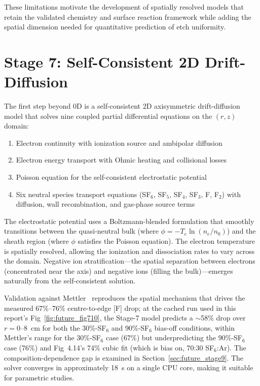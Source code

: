 \documentclass[11pt,a4paper]{report}
\newcommand{\Te}{T_e}
\begin{document}
These limitations motivate the development of spatially resolved models that retain the validated chemistry and surface reaction framework while adding the spatial dimension needed for quantitative prediction of etch uniformity.

\section{Stage 7: Self-Consistent 2D Drift-Diffusion}
\label{sec:future_stage7}

The first step beyond 0D is a self-consistent 2D axisymmetric drift-diffusion model that solves nine coupled partial differential equations on the $(r,z)$ domain:

\begin{enumerate}[nosep]
\item Electron continuity with ionization source and ambipolar diffusion
\item Electron energy transport with Ohmic heating and collisional losses
\item Poisson equation for the self-consistent electrostatic potential
\item Six neutral species transport equations (SF$_6$, SF$_5$, SF$_4$, SF$_3$, F, F$_2$) with diffusion, wall recombination, and gas-phase source terms
\end{enumerate}

The electrostatic potential uses a Boltzmann-blended formulation that smoothly transitions between the quasi-neutral bulk (where $\phi = -\Te \ln(n_e/n_0)$) and the sheath region (where $\phi$ satisfies the Poisson equation).  The electron temperature is spatially resolved, allowing the ionization and dissociation rates to vary across the domain.  Negative ion stratification---the spatial separation between electrons (concentrated near the axis) and negative ions (filling the bulk)---emerges naturally from the self-consistent solution.

Validation against Mettler~\cite{Mettler2025} reproduces the spatial mechanism that drives the measured 67\%--76\% centre-to-edge [F] drop; at the cached run used in this report's Fig~\ref{fig:future_fig710}, the Stage-7 model predicts a $\sim$58\% drop over $r = 0$--\SI{8}{\centi\meter} for both the 30\%-SF$_6$ and 90\%-SF$_6$ bias-off conditions, within Mettler's range for the 30\%-SF$_6$ case (67\%) but underpredicting the 90\%-SF$_6$ case (76\%) and Fig~4.14's 74\% cubic fit (which is bias on, 70:30 SF$_6$:Ar).  The composition-dependence gap is examined in Section~\ref{sec:future_stage9}.  The solver converges in approximately \SI{18}{\second} on a single CPU core, making it suitable for parametric studies.
\end{document}

